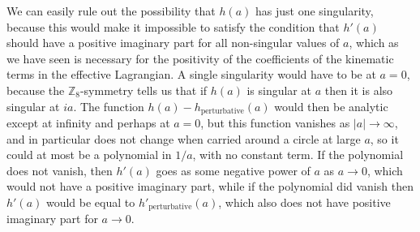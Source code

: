 We can easily rule out the possibility that \(h(a)\) has just one
singularity, because this would make it impossible to satisfy the condition
that \(h'(a)\) should have a positive imaginary part for all non-singular
values of \(a\), which as we have seen is necessary for the positivity of
the coefficients of the kinematic terms in the effective Lagrangian. A
single singularity would have to be at \(a=0\), because the
\(\mathbb{Z}_8\)-symmetry tells us that if \(h(a)\) is singular at \(a\)
then it is also singular at \(ia\). The function
\(h(a)-h_{\mathrm{perturbative}}(a)\) would then be analytic except at
infinity and perhaps at \(a=0\), but this function vanishes as
\(\lvert a\rvert\longrightarrow\infty\), and in particular does not change
when carried around a circle at large \(a\), so it could at most be a
polynomial in \(1/a\), with no constant term. If the polynomial does not
vanish, then \(h'(a)\) goes as some negative power of \(a\) as
\(a\longrightarrow0\), which would not have a positive imaginary part,
while if the polynomial did vanish then \(h'(a)\) would be equal to
\(h'_{\mathrm{perturbative}}(a)\), which also does not have positive
imaginary part for \(a\longrightarrow0\).


